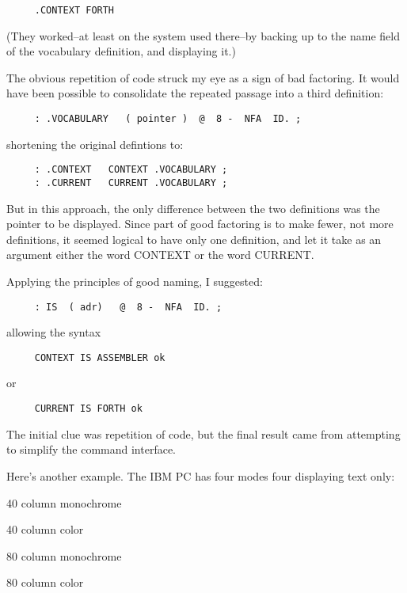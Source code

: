 \begin{verbatim}
     .CONTEXT FORTH
\end{verbatim}
(They worked--at least on the system used there--by backing up to the name field of the vocabulary definition, and displaying it.)

The obvious repetition of code struck my eye as a sign of bad factoring. It would have been possible to consolidate the repeated passage into a third definition:

\begin{verbatim}
     : .VOCABULARY   ( pointer )  @  8 -  NFA  ID. ;
\end{verbatim}
shortening the original defintions to:

\begin{verbatim}
     : .CONTEXT   CONTEXT .VOCABULARY ;
     : .CURRENT   CURRENT .VOCABULARY ;
\end{verbatim}
But in this approach, the only difference between the two definitions was the pointer to be displayed. Since part of good factoring is to make fewer, not more definitions, it seemed logical to have only one definition, and let it take as an argument either the word CONTEXT or the word CURRENT.

Applying the principles of good naming, I suggested:

\begin{verbatim}
     : IS  ( adr)   @  8 -  NFA  ID. ;
\end{verbatim}
allowing the syntax

\begin{verbatim}
     CONTEXT IS ASSEMBLER ok
\end{verbatim}
or

\begin{verbatim}
     CURRENT IS FORTH ok
\end{verbatim}
The initial clue was repetition of code, but the final result came from attempting to simplify the command interface.

Here's another example. The IBM PC has four modes four displaying text only:

\bigskip

40 column monochrome

40 column color

80 column monochrome

80 column color

\bigskip

